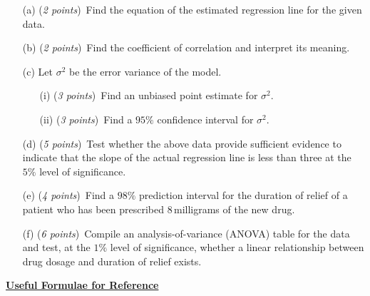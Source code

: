 \documentclass[12pt]{article}
\begin{document}
\vspace{0.2cm}

\begin{enumerate}
\item[(a)]
({\em 2 points\/})~Find the equation of the estimated regression line for the given data.

\vspace{1.7cm}

\item[(b)]
({\em 2 points\/})~Find the coefficient of correlation and interpret its meaning.

\newpage

\item[(c)]
Let $\sigma^2$ be the error variance of the model.
\begin{enumerate}
\item[(i)]
({\em 3 points\/})~Find an unbiased point estimate for $\sigma^2$.
\item[(ii)]
({\em 3 points\/})~Find a $95\%$ confidence interval for $\sigma^2$.
\end{enumerate}

\vspace{15cm}

\item[(d)]
({\em 5 points\/})~Test whether the above data provide sufficient evidence to indicate that the slope of the actual regression line is less than three at the $5\%$ level of significance.

\vspace{10cm}

\item[(e)]
({\em 4 points\/})~Find a $98\%$ prediction interval for the duration of relief of a patient who has been prescribed 8\,milligrams of the new drug.

\vspace{10cm}

\item[(f)]
({\em 6 points\/})~Compile an analysis-of-variance (ANOVA) table for the data and test, at the $1\%$ level of significance, whether a linear relationship between drug dosage and duration of relief exists.

\vspace{10cm}

\end{enumerate}

\newpage

\begin{center}
\underline{\bf Useful Formulae for Reference}
\end{center}
\end{document}
